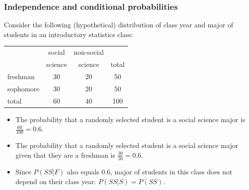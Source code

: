 \documentclass[11pt,containsverbatim,handout]{beamer}
\begin{document}
\begin{frame}
\frametitle{Independence and conditional probabilities}

Consider the following (hypothetical) distribution of class year and major of students in an introductory statistics class:

{\small
\begin{center}
\begin{tabular}{l | c c | c}
			& social	& non-social 		&  \\
			& science	& science	& total \\
\hline
freshman		& 30		& 20		& 50 \\
sophomore			& 30		& 20		& 50 \\
\hline
total			& 60		& 40		& 100
\end{tabular}
\end{center}
}

\pause

\begin{itemize}

\item The probability that a randomly selected student is a social science major is \pause $\frac{60}{100} = 0.6$. 

\pause

\item The probability that a randomly selected student is a social science major given that they are a freshman is \pause $\frac{30}{50} = 0.6$. 

\pause

\item Since $P(SS | F)$ also equals 0.6, major of students in this class does not depend on their class year: $P(SS | S) = P(SS)$.

\end{itemize}

\end{frame}

\end{document}
